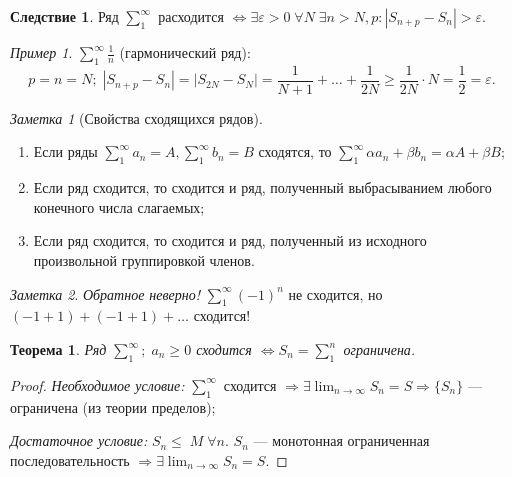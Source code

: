 \documentclass[a4paper,12pt]{article}
\newtheorem*{theorem}{Теорема}
\theoremstyle{remark}
\newtheorem*{note}{Заметка}
\newtheorem*{example}{Пример}
\theoremstyle{definition}
\newtheorem*{effect}{Следствие}
\begin{document}
\begin{effect}
    Ряд \(\sum^\infty_1\) расходится \(\Leftrightarrow \exists \varepsilon > 0\; \forall N\; \exists n > N, p: |S_{n + p} - S_n| > \varepsilon\).
\end{effect}

\begin{example}
    \(\sum^\infty_1 \frac{1}{n}\) (гармонический ряд):
    \begin{equation*}
        p = n = N;\; |S_{n+p} - S_n| = |S_{2N} - S_N| = \frac{1}{N+1} + \dots + \frac{1}{2N} \geqslant \frac{1}{2N} \cdot N = \frac{1}{2} = \varepsilon.
    \end{equation*}
\end{example}

\begin{note}[Свойства сходящихся рядов]
    \begin{enumerate}
        \item Если ряды \(\sum_{1}^{\infty} a_n = A, \sum_{1}^{\infty} b_n = B\) сходятся, то \(\sum_{1}^{\infty} \alpha a_n + \beta b_n = \alpha A + \beta B\);
        \item Если ряд сходится, то сходится и ряд, полученный выбрасыванием любого конечного числа слагаемых;
        \item Если ряд сходится, то сходится и ряд, полученный из исходного произвольной группировкой членов.
    \end{enumerate}
\end{note}

\begin{note}
    \emph{Обратное неверно!} \(\sum_{1}^{\infty} (-1)^n\) не сходится, но \((-1 + 1) + (-1 + 1) + \dots\) сходится!
\end{note}

\begin{theorem}
    Ряд \(\sum_{1}^{\infty};\;a_n \geqslant 0\) сходится \(\Leftrightarrow S_n = \sum_{1}^{n}\) ограничена.
\end{theorem}

\begin{proof}
    \emph{Необходимое условие:} \(\sum_{1}^{\infty}\) сходится \(\Rightarrow \exists \lim_{n \rightarrow \infty} S_n = S \Rightarrow \{S_n\}\) --- ограничена (из теории пределов);
    
    \emph{Достаточное условие:} \(S_n \leqslant\; M\; \forall n\). \(S_n\) --- монотонная ограниченная последовательность \(\Rightarrow \exists \lim_{n \rightarrow \infty} S_n = S\).
\end{proof}
\end{document}
